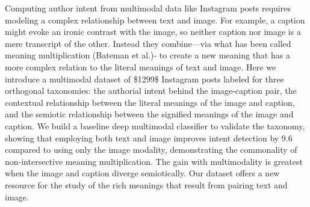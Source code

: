Computing author intent from multimodal data like Instagram posts requires modeling a complex relationship between text and image. For example, a caption might evoke an ironic contrast with the image, so neither caption nor image is a mere transcript of the other. Instead they combine---via what has been called meaning multiplication (Bateman et al.)- to create a new meaning that has a more complex relation to the literal meanings of text and image. Here we introduce a multimodal dataset of \$1299\$ Instagram posts labeled for three orthogonal taxonomies: the authorial intent behind the image-caption pair, the contextual relationship between the literal meanings of the image and caption, and the semiotic relationship between the signified meanings of the image and caption. We build a baseline deep multimodal classifier to validate the taxonomy, showing that employing both text and image improves intent detection by 9.6 compared to using only the image modality, demonstrating the commonality of non-intersective meaning multiplication. The gain with multimodality is greatest when the image and caption diverge semiotically. Our dataset offers a new resource for the study of the rich meanings that result from pairing text and image.
